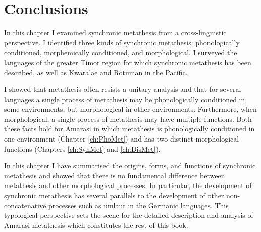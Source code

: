 \section{Conclusions}\label{sec:MorMetCon}
In this chapter I examined synchronic metathesis from
a cross-linguistic perspective.
I identified three kinds of synchronic metathesis:
phonologically conditioned, morphemically conditioned, and morphological.
I surveyed the languages of the greater Timor region
for which synchronic metathesis has been described,
as well as Kwara'ae and Rotuman in the Pacific.

I showed that metathesis often resists a unitary analysis
and that for several languages a single process of metathesis may be phonologically conditioned
in some environments, but morphological in other environments.
Furthermore, when morphological, a single process of metathesis may have multiple functions.
Both these facts hold for Amarasi in which metathesis is
phonologically conditioned in one environment (Chapter \ref{ch:PhoMet})
and has two distinct morphological functions (Chapters \ref{ch:SynMet} and \ref{ch:DisMet}).

In this chapter I have summarised the origins, forms, and functions of synchronic metathesis
and showed that there is no fundamental difference between metathesis
and other morphological processes.
In particular, the development of synchronic metathesis has
several parallels to the development of other non-concatenative
processes such as umlaut in the Germanic languages.
This typological perspective sets the scene for the detailed description
and analysis of Amarasi metathesis which constitutes the rest of this book.
	